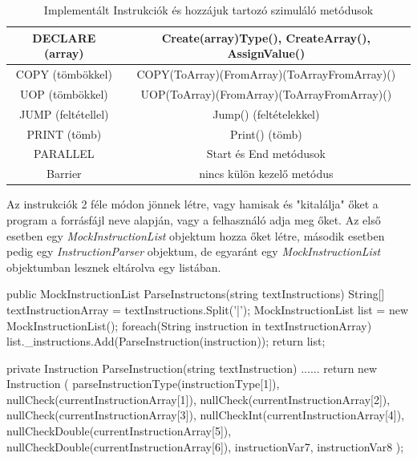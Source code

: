 \begin{table}[h!]
\centering
\caption{Implementált Instrukciók és hozzájuk tartozó szimuláló metódusok}
\label{tab:instru}
\begin{tabular}{|c|c|}
\hline
DECLARE (array) & Create(array)Type(), CreateArray(), AssignValue()  \\
\hline
COPY (tömbökkel) & COPY(ToArray)(FromArray)(ToArrayFromArray)() \\
\hline
UOP (tömbökkel) & UOP(ToArray)(FromArray)(ToArrayFromArray)() \\
\hline
JUMP (feltétellel) & Jump() (feltételekkel)\\
\hline 
PRINT (tömb) & Print() (tömb) \\
\hline
PARALLEL & Start és End metódusok \\
\hline
Barrier & nincs külön kezelő metódus \\
\hline
\end{tabular}
\end{table}

Az instrukciók 2 féle módon jönnek létre, vagy hamisak és "kitalálja" őket a program a forrásfájl neve alapján, vagy a felhasználó adja meg őket. Az első esetben egy \textit{MockInstructionList} objektum hozza őket létre, második esetben pedig egy \textit{InstructionParser} objektum, de egyaránt egy \textit{MockInstructionList} objektumban lesznek eltárolva egy listában.

\begin{cpp}
public MockInstructionList ParseInstructons(string textInstructions)
{
    String[] textInstructionArray = textInstructions.Split('|');
    MockInstructionList list = new MockInstructionList();
    foreach(String instruction in textInstructionArray)
    {         
        list._instructions.Add(ParseInstruction(instruction));
    }
    return list;
}
        
private Instruction ParseInstruction(string textInstruction)
{
    ......
    return  new Instruction
	(
        parseInstructionType(instructionType[1]),
        nullCheck(currentInstructionArray[1]),
        nullCheck(currentInstructionArray[2]),
        nullCheck(currentInstructionArray[3]), 
        nullCheckInt(currentInstructionArray[4]),
        nullCheckDouble(currentInstructionArray[5]),
        nullCheckDouble(currentInstructionArray[6]),
        instructionVar7,
        instructionVar8
	);
}
\end{cpp}





